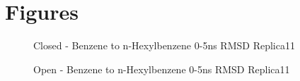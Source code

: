 \documentclass[journal=jctcce,manuscript=article]{achemso}
\begin{document}
\section{Figures}
\begin{figure}[!ht]
   \caption{Closed - Benzene to n-Hexylbenzene 0-5ns RMSD Replica11}
   \label{fig:c_opls3_1/RMSD-replica11}
\end{figure}

\begin{figure}[!h]
   \caption{Open - Benzene to n-Hexylbenzene 0-5ns RMSD Replica11}
   \label{fig:o_opls3_1/RMSD-replica11}
\end{figure}
\end{document}
